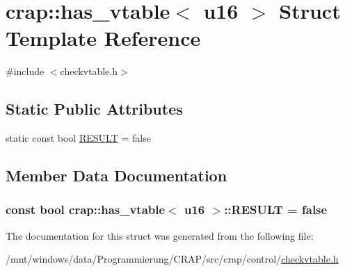 \hypertarget{structcrap_1_1has__vtable_3_01u16_01_4}{\section{crap\-:\-:has\-\_\-vtable$<$ u16 $>$ Struct Template Reference}
\label{structcrap_1_1has__vtable_3_01u16_01_4}
}


{\ttfamily \#include $<$checkvtable.\-h$>$}

\subsection*{Static Public Attributes}
\begin{DoxyCompactItemize}
\item 
static const bool \hyperlink{structcrap_1_1has__vtable_3_01u16_01_4_a09cffb95ad9b11addf5e377c6525d455}{R\-E\-S\-U\-L\-T} = false
\end{DoxyCompactItemize}


\subsection{Member Data Documentation}
\hypertarget{structcrap_1_1has__vtable_3_01u16_01_4_a09cffb95ad9b11addf5e377c6525d455}{
\subsubsection[{R\-E\-S\-U\-L\-T}]{\setlength{\rightskip}{0pt plus 5cm}const bool {\bf crap\-::has\-\_\-vtable}$<$ {\bf u16} $>$\-::R\-E\-S\-U\-L\-T = false\hspace{0.3cm}{\ttfamily [static]}}}\label{structcrap_1_1has__vtable_3_01u16_01_4_a09cffb95ad9b11addf5e377c6525d455}


The documentation for this struct was generated from the following file\-:\begin{DoxyCompactItemize}
\item 
/mnt/windows/data/\-Programmierung/\-C\-R\-A\-P/src/crap/control/\hyperlink{checkvtable_8h}{checkvtable.\-h}\end{DoxyCompactItemize}
